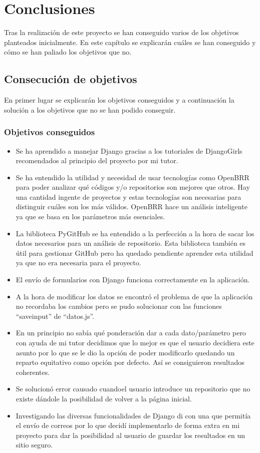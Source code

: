 \documentclass[a4paper, 12pt]{book}
\begin{document}
\chapter{Conclusiones}
\label{chap:conclusiones}
Tras la realización de este proyecto se han conseguido varios de los objetivos planteados inicialmente. En este capítulo se explicarán cuáles se han conseguido y cómo se han paliado los objetivos que no.
\section{Consecución de objetivos}
\label{sec:consecucion-objetivos}
En primer lugar se explicarán los objetivos conseguidos y a continuación la solución a los objetivos que no se han podido conseguir.
\subsection{Objetivos conseguidos}
\begin{itemize}
	\item Se ha aprendido a manejar Django gracias a los tutoriales de DjangoGirls recomendados al principio del proyecto por mi tutor.
	\item Se ha entendido la utilidad y necesidad de usar tecnologías como OpenBRR para poder analizar qué códigos y/o repositorios son mejores que otros. Hay una cantidad ingente de proyectos y estas tecnologías son necesarias para distinguir cuáles son los más válidos. OpenBRR hace un análisis inteligente ya que se basa en los parámetros más esenciales.
	\item La biblioteca PyGitHub se ha entendido a la perfección a la hora de sacar los datos necesarios para un análisis de repositorio. Esta biblioteca también es útil para gestionar GitHub pero ha quedado pendiente aprender esta utilidad ya que no era necesaria para el proyecto.
	\item El envío de formularios con Django funciona correctamente en la aplicación.
	\item A la hora de modificar los datos se encontró el problema de que la aplicación no recordaba los cambios pero se pudo solucionar con las funciones ``save\textunderscore input'' de ``datos.js''.
	\item En un principio no sabía qué ponderación dar a cada dato/parámetro pero con ayuda de mi tutor decidimos que lo mejor es que el usuario decidiera este asunto por lo que se le dio la opción de poder modificarlo quedando un reparto equitativo como opción por defecto. Así se consiguieron resultados coherentes.
	\item Se solucionó error causado cuandoel usuario introduce un repositorio que no existe dándole la posibilidad de volver a la página inicial.
	\item Investigando las diversas funcionalidades de Django di con una que permitía el envío de correos por lo que decidí implementarlo de forma extra en mi proyecto para dar la posibilidad al usuario de guardar los resultados en un sitio seguro.
\end{itemize}
\end{document}
